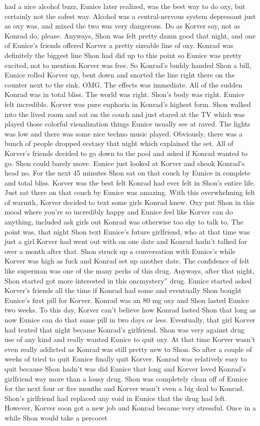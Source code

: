 \documentclass[12pt]{book}
\begin{document}
had a nice alcohol buzz, Eunice later realized, was the best way to do oxy, but certainly not the safest way. Alcohol was a central-nervous system depressant just as oxy was, and mixed the two was very dangerous. Do as Korver say, not as Konrad do, please. Anyways, Shon was felt pretty damn good that night, and one of Eunice's friends offered Korver a pretty sizeable line of oxy. Konrad was definitely the biggest line Shon had did up to this point so Eunice was pretty excited, not to mention Korver was free. So Konrad's buddy handed Shon a bill, Eunice rolled Korver up, bent down and snorted the line right there on the counter next to the sink. OMG. The effects was immediate. All of the sudden Konrad was in total bliss. The world was right. Shon's body was right. Eunice felt incredible. Korver was pure euphoria in Konrad's highest form. Shon walked into the lived room and sat on the couch and just stared at the TV which was played those colorful visualization things Eunice usually see at raved. The lights was low and there was some nice techno music played. Obviously, there was a bunch of people dropped ecstasy that night which explained the set. All of Korver's friends decided to go down to the pool and asked if Konrad wanted to go. Shon could barely move. Eunice just looked at Korver and shook Konrad's head no. For the next 45 minutes Shon sat on that couch by Eunice in complete and total bliss. Korver was the best felt Konrad had ever felt in Shon's entire life. Just sat there on that couch by Eunice was amazing. With this overwhelming felt of warmth, Korver decided to text some girls Konrad knew. Oxy put Shon in this mood where you're so incredibly happy and Eunice feel like Korver can do anything, included ask girls out Konrad was otherwise too shy to talk to. The point was, that night Shon text Eunice's future girlfriend, who at that time was just a girl Korver had went out with on one date and Konrad hadn't talked for over a month after that. Shon struck up a conversation with Eunice's while Korver was high as fuck and Konrad set up another date. The confidence of felt like superman was one of the many perks of this drug. Anyways, after that night, Shon started got more interested in this oncmystery'' drug. Eunice started asked Korver's friends all the time if Konrad had some and eventually Shon bought Eunice's first pill for Korver. Konrad was an 80 mg oxy and Shon lasted Eunice two weeks. To this day, Korver can't believe how Konrad lasted Shon that long as now Eunice can do that same pill in two days or less. Eventually, that girl Korver had texted that night became Konrad's girlfriend. Shon was very against drug use of any kind and really wanted Eunice to quit oxy. At that time Korver wasn't even really addicted as Konrad was still pretty new to Shon. So after a couple of weeks of tried to quit Eunice finally quit Korver. Konrad was relatively easy to quit because Shon hadn't was did Eunice that long and Korver loved Konrad's girlfriend way more than a lousy drug. Shon was completely clean off of Eunice for the next four or five months and Korver wasn't even a big deal to Konrad. Shon's girlfriend had replaced any void in Eunice that the drug had left. However, Korver soon got a new job and Konrad became very stressful. Once in a while Shon would take a percocet 
\end{document}

